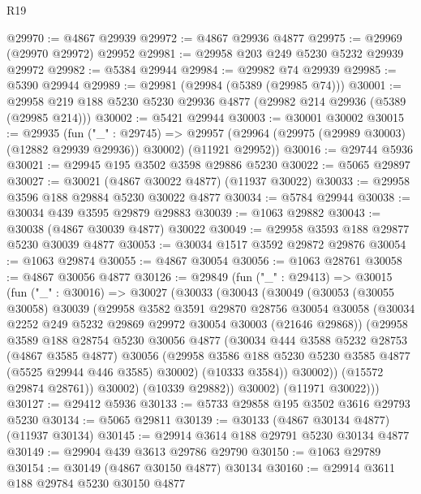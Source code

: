 \begin{lexlean}{R19}
\begin{coremodule}
@29970 := @4867 @29939
@29972 := @4867 @29936 @4877
@29975 := @29969 (@29970 @29972) @29952
@29981 := @29958 @203 @249 @5230 @5232 @29939 @29972
@29982 := @5384 @29944
@29984 := @29982 @74 @29939
@29985 := @5390 @29944
@29989 := @29981 (@29984 (@5389 (@29985 @74)))
@30001 := @29958 @219 @188 @5230 @5230 @29936 @4877 (@29982 @214 @29936 (@5389 (@29985 @214)))
@30002 := @5421 @29944
@30003 := @30001 @30002
@30015 := @29935
    (fun ("_" : @29745) =>
    @29957 (@29964 (@29975 (@29989 @30003) (@12882 @29939 @29936)) @30002) (@11921 @29952))
@30016 := @29744 @5936
@30021 := @29945 @195 @3502 @3598 @29886 @5230
@30022 := @5065 @29897
@30027 := @30021 (@4867 @30022 @4877) (@11937 @30022)
@30033 := @29958 @3596 @188 @29884 @5230 @30022 @4877
@30034 := @5784 @29944
@30038 := @30034 @439 @3595 @29879 @29883
@30039 := @1063 @29882
@30043 := @30038 (@4867 @30039 @4877) @30022
@30049 := @29958 @3593 @188 @29877 @5230 @30039 @4877
@30053 := @30034 @1517 @3592 @29872 @29876
@30054 := @1063 @29874
@30055 := @4867 @30054
@30056 := @1063 @28761
@30058 := @4867 @30056 @4877
@30126 := @29849
    (fun ("_" : @29413) =>
    @30015
      (fun ("_" : @30016) =>
      @30027
        (@30033
          (@30043
            (@30049
              (@30053
                (@30055 @30058)
                @30039
                (@29958
                  @3582
                  @3591
                  @29870
                  @28756
                  @30054
                  @30058
                  (@30034 @2252 @249 @5232 @29869 @29972 @30054 @30003 (@21646 @29868))
                  (@29958
                    @3589
                    @188
                    @28754
                    @5230
                    @30056
                    @4877
                    (@30034
                      @444
                      @3588
                      @5232
                      @28753
                      (@4867 @3585 @4877)
                      @30056
                      (@29958 @3586 @188 @5230 @5230 @3585 @4877 (@5525 @29944 @446 @3585) @30002)
                      (@10333 @3584))
                    @30002))
                (@15572 @29874 @28761))
              @30002)
            (@10339 @29882))
          @30002)
        (@11971 @30022)))
@30127 := @29412 @5936
@30133 := @5733 @29858 @195 @3502 @3616 @29793 @5230
@30134 := @5065 @29811
@30139 := @30133 (@4867 @30134 @4877) (@11937 @30134)
@30145 := @29914 @3614 @188 @29791 @5230 @30134 @4877
@30149 := @29904 @439 @3613 @29786 @29790
@30150 := @1063 @29789
@30154 := @30149 (@4867 @30150 @4877) @30134
@30160 := @29914 @3611 @188 @29784 @5230 @30150 @4877

\end{coremodule}
\end{lexlean}
